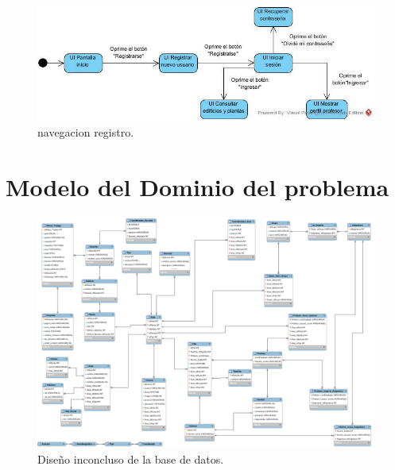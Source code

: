 \documentclass[oneside,10pt]{book}
\begin{document}
	\begin{figure}[htbp!]
		\centering
			\includegraphics[width=.5\textwidth]{mapa_nave/imagenesnav/registro}
		\caption{navegacion registro.}
	\end{figure}


\chapter{Modelo del Dominio del problema}

	\begin{figure}[htbp!]
		\centering
			\includegraphics[width=1\textwidth]{images/baseDeDatos}
		\caption{Diseño inconcluso de la base de datos.}
	\end{figure}



\end{document}
